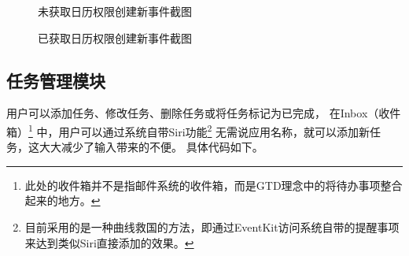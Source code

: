 \begin{figure}[!htbp]
	\centering
	\caption{未获取日历权限创建新事件截图}
	\label{fig:new_event_no_access}
\end{figure}

\begin{figure}[!htbp]
	\centering
	\caption{已获取日历权限创建新事件截图}
	\label{fig:new_event}
\end{figure}

\subsection{任务管理模块}
用户可以添加任务、修改任务、删除任务或将任务标记为已完成，
在Inbox（收件箱）\footnote{此处的收件箱并不是指邮件系统的收件箱，而是GTD理念中的将待办事项整合起来的地方。}
中，用户可以通过系统自带Siri功能\footnote{目前采用的是一种曲线救国的方法，即通过EventKit访问系统自带的提醒事项来达到类似Siri直接添加的效果。}
无需说应用名称，就可以添加新任务，这大大减少了输入带来的不便。
具体代码如下。

